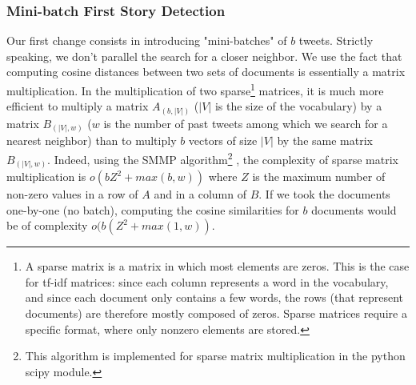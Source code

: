 \subsubsection{Mini-batch First Story Detection}
\label{Subsec: FSD}
 Our first change consists in introducing "mini-batches" of $b$ tweets. Strictly speaking, we don't parallel the search for a closer neighbor. We use the fact that 
computing cosine distances between two sets of documents is essentially a matrix multiplication. In the multiplication of two sparse\footnote{A sparse matrix is a matrix in which most elements are zeros. This is the case for tf-idf matrices: since each column represents a word in the vocabulary, and since each document only contains a few words, the rows (that represent documents) are therefore mostly composed of zeros. Sparse matrices require a specific format, where only nonzero elements are stored.} matrices, it is much more efficient to multiply a matrix $A_{(b,|V|)}$ ($|V|$ is the size of the vocabulary) by a matrix $B_{(|V|,w)}$ ($w$ is the number of past tweets among which we search for a nearest neighbor) than to multiply $b$ vectors of size $|V|$ by the same matrix $B_{(|V|,w)}$. Indeed, using the SMMP algorithm\footnote{This algorithm is implemented for sparse matrix multiplication in the python scipy module.} \citep{banks_sparse_1993}, the complexity of sparse matrix multiplication is $o(bZ^2 + max(b,w))$  where $Z$ is the maximum number of non-zero values in a row of $A$ and in a column of $B$. If we took the documents one-by-one (no batch), computing the cosine similarities for $b$ documents would be of complexity $o(b(Z
^2 + max(1, w))$.
 
